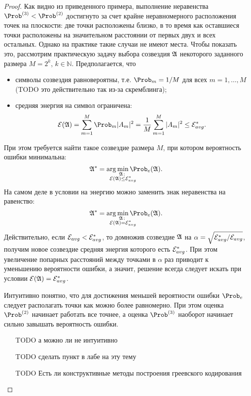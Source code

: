 \documentclass{book}
\numberwithin{theorem}{chapter}
\numberwithin{statement}{chapter}
\numberwithin{lemma}{chapter}
\theoremstyle{definition}
\numberwithin{task}{chapter}
\theoremstyle{remark}
\numberwithin{example}{chapter}
\theoremstyle{definition}
\numberwithin{definition}{chapter}
\theoremstyle{remark}
\theoremstyle{remark}
\numberwithin{lyrics}{section}
\begin{document}
\begin{proof}
Как видно из приведенного примера, выполнение неравенства $\Prob^{(3)} < \Prob^{(2)}$ достигнуто за счет крайне неравномерного расположения точек на плоскости: две точки расположены близко, в то время как оставшиеся точки расположены на значительном расстоянии от первых двух и всех остальных. 
Однако на практике такие случаи не имеют места. Чтобы показать это, рассмотрим практическую задачу выбора созвездия $\mathfrak{A}$ некоторого заданного размера $M=2^k$, $k \in \mathbb{N}$. Предполагается, что 
\begin{itemize}
	\item символы созвездия равновероятны, т.е. $\Prob_m = 1/M$ для всех $m = 1,\dots, M$ (TODO это действительно так из-за скремблинга);
	\item средняя энергия на символ ограничена:
	$$
	\Energy(\Const) = \Sum_{m=1}^M \Prob_m |A_m|^2 = \frac{1}{M} \Sum_{m=1}^M |A_m|^2 \le \Energy_{avg}^*.
	$$
\end{itemize}
При этом требуется найти такое созвездие размера $M$, при котором вероятность ошибки минимальна:
$$
\Const^* = \arg \min\limits_{\mathclap{\substack{\Const\colon\\ \Energy(\Const) \le \Energy_{avg}^*}}} \Prob_e(\Const).
$$
На самом деле в условии на энергию можно заменить знак неравенства на равенство:
$$
\Const^* = \arg \min\limits_{\mathclap{\substack{\Const\colon\\ \Energy(\Const) = \Energy_{avg}^*}}} \Prob_e(\Const).
$$
Действительно, если $\mathcal{E}_{avg} < \mathcal{E}_{avg}^*$, то домножив созвездие $\mathfrak{A}$ на $\alpha = \sqrt{\mathcal{E}_{avg}^* / \mathcal{E}_{avg}}$, получим новое созвездие средняя энергия которого есть $\mathcal{E}_{avg}^*$. При этом увеличение попарных расстояний между точками в $\alpha$ раз приводит к уменьшению вероятности ошибки, а значит, решение всегда следует искать при условии $\mathcal{E}(\mathfrak{A}) = \mathcal{E}_{avg}^*$.

Интуитивно понятно, что для достижения меньшей вероятности ошибки $\Prob_e$ следует располагать точки как можно более равномерно. При этом оценка $\Prob^{(2)}$ начинает работать все точнее, а оценка $\Prob^{(3)}$ наоборот начинает сильно завышать вероятность ошибки. 

\begin{itemize}
	\item [TODO а можно ли не интуитивно]
	\item [TODO сделать пункт в лабе на эту тему]
	\item [TODO Есть ли конструктивные методы построения греевского кодирования]
\end{itemize}
\end{proof}
\end{document}
